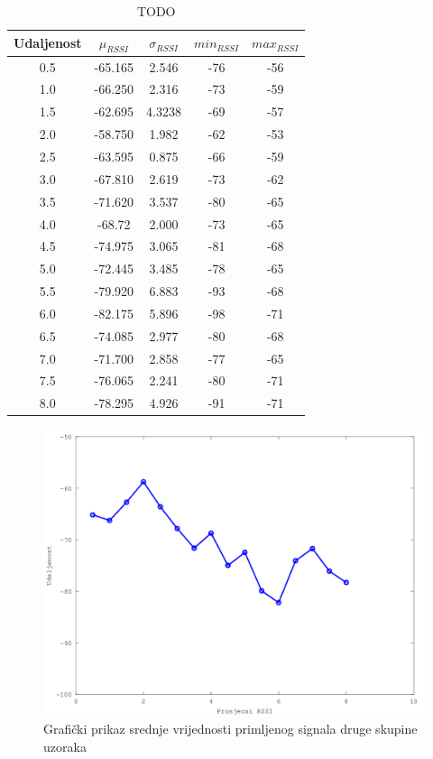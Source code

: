 \begin{table}[H]
	\centering
	\caption{TODO}
	\label{tbl:indoorKontaktMaxTx}
	\begin{tabular}{ccccc}
	\hline 
	Udaljenost & $\mu_{RSSI}$ & $\sigma_{RSSI}$ & $min_{RSSI}$ & $max_{RSSI}$ \\ 
	\hline 
	0.5 & -65.165 & 2.546 & -76 & -56 \\
	1.0 & -66.250 & 2.316 & -73 & -59 \\
	1.5 & -62.695 & 4.3238 & -69 & -57 \\
	2.0 & -58.750 & 1.982 & -62 & -53 \\
	2.5 & -63.595 & 0.875 & -66 & -59 \\
	3.0 & -67.810 & 2.619 & -73 & -62 \\
	3.5 & -71.620 & 3.537 & -80 & -65 \\
	4.0 & -68.72 & 2.000 & -73 & -65 \\
	4.5 & -74.975 & 3.065 & -81 & -68 \\
	5.0 & -72.445 & 3.485 & -78 & -65 \\
	5.5 & -79.920 & 6.883 & -93 & -68 \\
	6.0 & -82.175 & 5.896 & -98 & -71 \\
	6.5 & -74.085 & 2.977 & -80 & -68 \\
	7.0 & -71.700 & 2.858 & -77 & -65 \\
	7.5 & -76.065 & 2.241 & -80 & -71 \\
	8.0 & -78.295 & 4.926 & -91 & -71 \\
	\hline
	\end{tabular}
\end{table}

\begin{figure}[H]
    \centering
    \includegraphics[scale=0.62]{pictures/druga-skupina-uzoraka}
    \caption{Grafički prikaz srednje vrijednosti primljenog signala druge skupine uzoraka}
    \label{fig:druga_skupina}
\end{figure}

